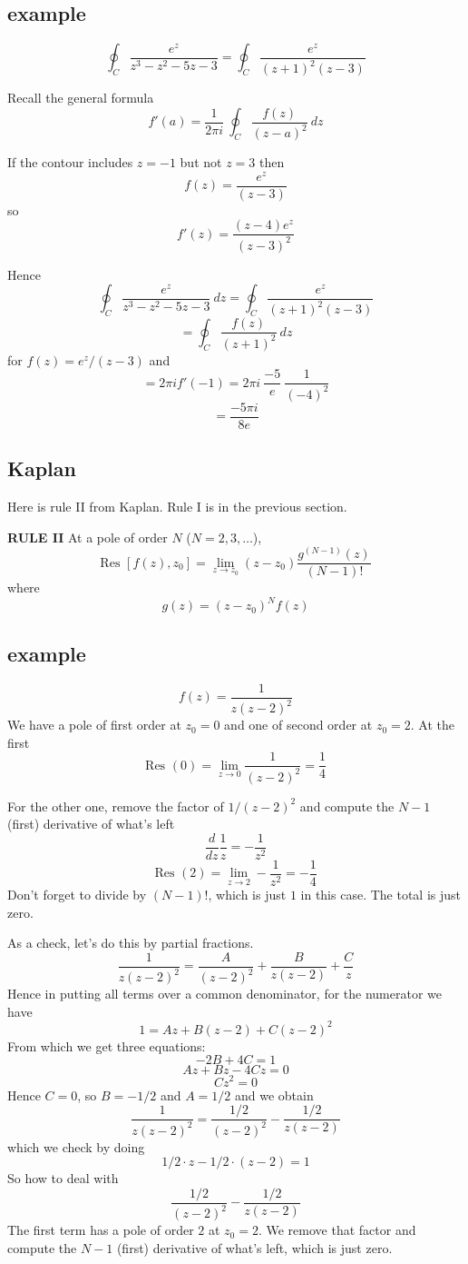 \documentclass[11pt, oneside]{article}
\begin{document}
\subsection*{example}
\[ \oint_C \frac{e^z}{z^3 - z^2 - 5z - 3} = \oint_C \frac{e^z}{(z+1)^2 (z-3)} \]

Recall the general formula
\[ f'(a) = \frac{1}{2 \pi i} \ \oint_C \frac{f(z)}{(z-a)^2} \ dz \]

If the contour includes $z = -1$ but not $z = 3$ then
\[ f(z) = \frac{e^z}{(z-3)} \]
so
\[ f'(z) = \frac{(z-4)e^z}{(z-3)^2} \]

Hence
\[ \oint_C \frac{e^z}{z^3 - z^2 - 5z - 3} \ dz = \oint_C \frac{e^z}{(z+1)^2 (z-3)} \]
\[ = \oint_C \frac{f(z)}{(z+1)^2} \ dz \]
for $f(z) = e^z/(z-3) $ and
\[ = 2 \pi i f'(-1) = 2 \pi i \ \frac{-5}{e} \ \frac{1}{(-4)^2} \]
\[ = \frac{-5 \pi i}{8 e}  \]

\subsection*{Kaplan}
Here is rule II from Kaplan.  Rule I is in the previous section.

\textbf{RULE II}  At a pole of order $N$ ($N = 2, 3, \dots$),
\[ \text{Res } [f(z),z_0] = \lim_{z \rightarrow z_0} (z-z_0) \frac{g^{(N-1)}(z)}{(N-1)!} \]
where 
\[ g(z) = (z-z_0)^N f(z) \]

\subsection*{example}
\[ f(z) = \frac{1}{z(z-2)^2} \]
We have a pole of first order at $z_0=0$ and one of second order at $z_0=2$.  At the first
\[ \text{Res }(0) = \lim_{z \rightarrow 0} \frac{1}{(z-2)^2} = \frac{1}{4} \]

For the other one, remove the factor of $1/(z-2)^2$ and compute the $N-1$ (first) derivative of what's left
\[ \frac{d}{dz} \frac{1}{z} =  - \frac{1}{z^2} \]
\[ \text{Res } (2) = \lim_{z \rightarrow 2} -\frac{1}{z^2} = -\frac{1}{4} \]
Don't forget to divide by $(N-1)!$, which is just $1$ in this case.  The total is just zero.

As a check, let's do this by partial fractions.
\[ \frac{1}{z(z-2)^2} = \frac{A}{(z-2)^2} +  \frac{B}{z(z-2)} +  \frac{C}{z}  \]
Hence in putting all terms over a common denominator, for the numerator we have
\[ 1 = Az + B(z-2) + C(z-2)^2 \]
From which we get three equations:
\[ -2B + 4C = 1 \]
\[ Az + Bz - 4Cz = 0 \]
\[ Cz^2 = 0 \]
Hence $C = 0$, so $B = -1/2$ and $A = 1/2$ and we obtain
\[ \frac{1}{z(z-2)^2} = \frac{1/2}{(z-2)^2} - \frac{1/2}{z(z-2)} \]
which we check by doing
\[ 1/2 \cdot z - 1/2 \cdot (z-2) = 1 \]
So how to deal with 
\[ \frac{1/2}{(z-2)^2} - \frac{1/2}{z(z-2)} \]
The first term has a pole of order $2$ at $z_0 = 2$.  We remove that factor and compute the $N-1$ (first) derivative of what's left, which is just zero.  
\end{document}
